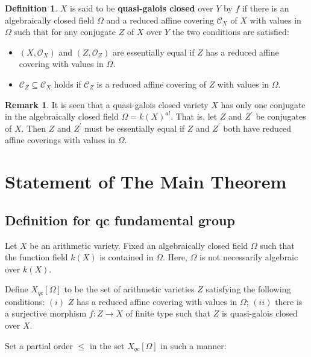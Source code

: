 \documentclass[12pt,twoside,reqno]{amsart}
\theoremstyle{definition}
\newtheorem{definition}[theorem]{Definition}
\newtheorem{remark}[theorem]{Remark}
\numberwithin{equation}{section}
\begin{document}
\begin{definition}
$X$ is said to be \textbf{quasi-galois closed} over $Y$ by $f$ if there is an algebraically closed field $\Omega$
and a reduced affine covering $\mathcal{C}_{X}$ of $X$ with values in $
\Omega $ such that for any conjugate $Z$ of
$X$ over $Y$ the two conditions are satisfied:
\begin{itemize}
\item $(X,\mathcal{O}_{X})$ and $(Z,\mathcal{O}_{Z})$ are essentially equal if $Z$ has a reduced
affine covering with values in $\Omega$.

\item $\mathcal{C}_{Z}\subseteq \mathcal{C}_{X}$ holds if $\mathcal{C}_{Z}$
is a reduced affine covering of $Z$ with values in $\Omega $.
\end{itemize}
\end{definition}

\begin{remark}
It is seen that a quasi-galois closed variety $X$ has only one conjugate in
the algebraically closed field $\Omega =k\left( X\right) ^{al}$. That is,
let $Z$ and $Z^{\prime }$ be conjugates of $X.$ Then  $Z$ and $Z^{\prime }$ must be essentially equal if $Z$ and $Z^{\prime }$ both have reduced affine coverings
with values in $\Omega .$
\end{remark}

\section{Statement of The Main Theorem}

\subsection{Definition for qc fundamental group}

Let $X$ be an arithmetic variety. Fixed an algebraically closed field $\Omega $ such that the function field $k\left( X\right) $ is contained in $\Omega .$ Here, $\Omega $ is not necessarily algebraic over $k\left(
X\right) .$

Define $X_{qc}\left[ \Omega \right] $ to be the set of arithmetic varieties $Z$ satisfying the following conditions: $\left( i\right) $ $Z$ has a reduced
affine covering with values in $\Omega $; $\left( ii\right) $ there is a
surjective morphism $f:Z\rightarrow X$ of finite type such that $Z$ is
quasi-galois closed over $X.$

Set a partial order $\leq$ in the set $X_{qc}\left[ \Omega \right] $ in such
a manner:
\end{document}
